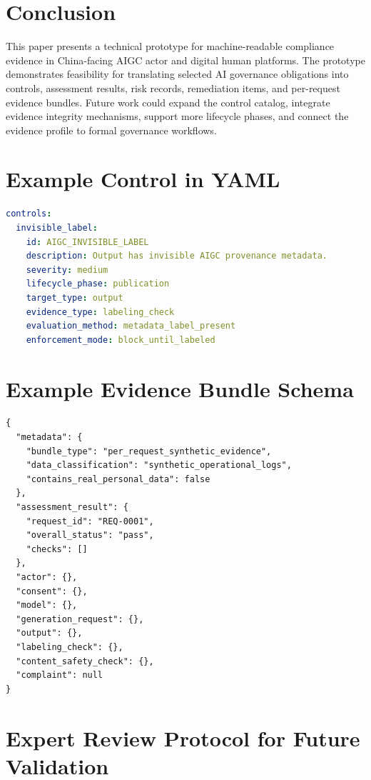\documentclass[10pt,journal]{IEEEtran}
\begin{document}
\section{Conclusion}

This paper presents a technical prototype for machine-readable compliance evidence in China-facing AIGC actor and digital human platforms. The prototype demonstrates feasibility for translating selected AI governance obligations into controls, assessment results, risk records, remediation items, and per-request evidence bundles. Future work could expand the control catalog, integrate evidence integrity mechanisms, support more lifecycle phases, and connect the evidence profile to formal governance workflows.

\clearpage
\appendices

\section{Example Control in YAML}

\begin{lstlisting}[language=yaml,caption={Example synthetic control rule.}]
controls:
  invisible_label:
    id: AIGC_INVISIBLE_LABEL
    description: Output has invisible AIGC provenance metadata.
    severity: medium
    lifecycle_phase: publication
    target_type: output
    evidence_type: labeling_check
    evaluation_method: metadata_label_present
    enforcement_mode: block_until_labeled
\end{lstlisting}

\section{Example Evidence Bundle Schema}

\begin{lstlisting}[caption={Simplified per-request evidence bundle schema.}]
{
  "metadata": {
    "bundle_type": "per_request_synthetic_evidence",
    "data_classification": "synthetic_operational_logs",
    "contains_real_personal_data": false
  },
  "assessment_result": {
    "request_id": "REQ-0001",
    "overall_status": "pass",
    "checks": []
  },
  "actor": {},
  "consent": {},
  "model": {},
  "generation_request": {},
  "output": {},
  "labeling_check": {},
  "content_safety_check": {},
  "complaint": null
}
\end{lstlisting}

\section{Expert Review Protocol for Future Validation}
\end{document}
